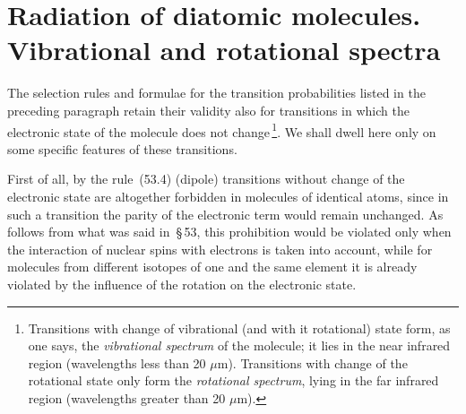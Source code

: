 \section{Radiation of diatomic molecules. Vibrational and rotational spectra}

The selection rules and formulae for the transition probabilities listed in the preceding paragraph retain their validity also for transitions in which the electronic state of the molecule does not change\,\footnote{Transitions with change of vibrational (and with it rotational) state form, as one says, the \textit{vibrational spectrum} of the molecule; it lies in the near infrared region (wavelengths less than 20 $\mu$m). Transitions with change of the rotational state only form the \textit{rotational spectrum}, lying in the far infrared region (wavelengths greater than 20 $\mu$m).}. We shall dwell here only on some specific features of these transitions.

First of all, by the rule~(53.4) (dipole) transitions without change of the electronic state are altogether forbidden in molecules of identical atoms, since in such a transition the parity of the electronic term would remain unchanged. As follows from what was said in~\S\,53, this prohibition would be violated only when the interaction of nuclear spins with electrons is taken into account, while for molecules from different isotopes of one and the same element it is already violated by the influence of the rotation on the electronic state.

